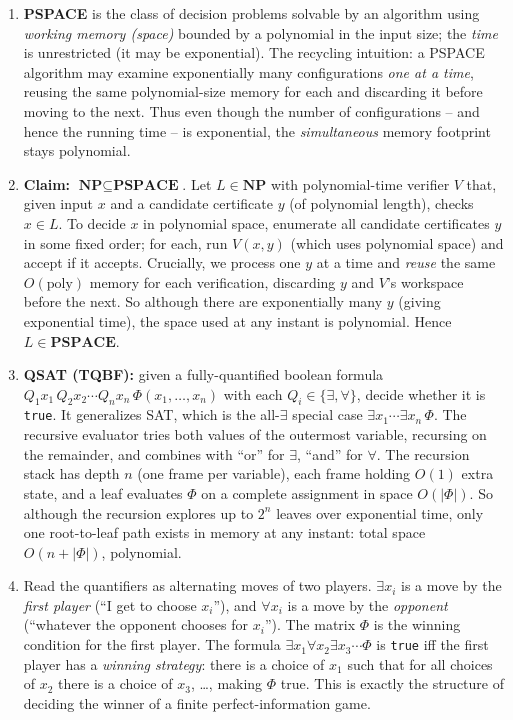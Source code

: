 \documentclass[11pt]{article}
\begin{document}
\begin{enumerate}[label=\textbf{A\arabic*.}, leftmargin=2.2em]

\item \textbf{PSPACE} is the class of decision problems solvable by an algorithm
using \emph{working memory (space)} bounded by a polynomial in the input size;
the \emph{time} is unrestricted (it may be exponential). The recycling
intuition: a PSPACE algorithm may examine exponentially many configurations
\emph{one at a time}, reusing the same polynomial-size memory for each and
discarding it before moving to the next. Thus even though the number of
configurations -- and hence the running time -- is exponential, the
\emph{simultaneous} memory footprint stays polynomial.

\item \textbf{Claim:} $\textbf{NP} \subseteq \textbf{PSPACE}$. Let $L \in
\textbf{NP}$ with polynomial-time verifier $V$ that, given input $x$ and a
candidate certificate $y$ (of polynomial length), checks $x \in L$. To decide
$x$ in polynomial space, enumerate all candidate certificates $y$ in some fixed
order; for each, run $V(x,y)$ (which uses polynomial space) and accept if it
accepts. Crucially, we process one $y$ at a time and \emph{reuse} the same
$O(\mathrm{poly})$ memory for each verification, discarding $y$ and $V$'s
workspace before the next. So although there are exponentially many $y$ (giving
exponential time), the space used at any instant is polynomial. Hence $L \in
\textbf{PSPACE}$.

\item \textbf{QSAT (TQBF):} given a fully-quantified boolean formula
$Q_1 x_1 \, Q_2 x_2 \cdots Q_n x_n \, \Phi(x_1,\dots,x_n)$ with each
$Q_i \in \{\exists, \forall\}$, decide whether it is \texttt{true}. It
generalizes SAT, which is the all-$\exists$ special case
$\exists x_1 \cdots \exists x_n\, \Phi$. The recursive evaluator tries both
values of the outermost variable, recursing on the remainder, and combines with
``or'' for $\exists$, ``and'' for $\forall$. The recursion stack has depth $n$
(one frame per variable), each frame holding $O(1)$ extra state, and a leaf
evaluates $\Phi$ on a complete assignment in space $O(|\Phi|)$. So although the
recursion explores up to $2^n$ leaves over exponential time, only one
root-to-leaf path exists in memory at any instant: total space
$O(n + |\Phi|)$, polynomial.

\item Read the quantifiers as alternating moves of two players. $\exists x_i$
is a move by the \emph{first player} (``I get to choose $x_i$''), and $\forall
x_i$ is a move by the \emph{opponent} (``whatever the opponent chooses for
$x_i$''). The matrix $\Phi$ is the winning condition for the first player. The
formula $\exists x_1 \forall x_2 \exists x_3 \cdots \Phi$ is \texttt{true} iff
the first player has a \emph{winning strategy}: there is a choice of $x_1$ such
that for all choices of $x_2$ there is a choice of $x_3$, \dots, making $\Phi$
true. This is exactly the structure of deciding the winner of a finite
perfect-information game.


\end{enumerate}
\end{document}
